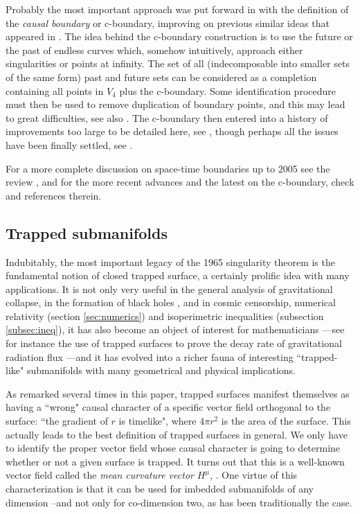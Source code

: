 \documentclass[12pt]{iopart}
\begin{document}
Probably the most important approach was put forward in \cite{GKP} with the definition of the {\em causal boundary} or c-boundary, improving on previous similar ideas that appeared in \cite{Se1}. The idea behind the c-boundary construction is to use the future or the past of endless curves which, somehow intuitively, approach either singularities or points at infinity. The set of all (indecomposable into smaller sets of the same form) past
and future sets can be considered as a completion containing all points in $V_4$ plus the
c-boundary. Some identification procedure must then be used to remove duplication of boundary points, and this may lead to great difficulties, see also \cite{HE}. The c-boundary then entered into a history of improvements too large to be detailed here, see \cite{MR,GS}, though perhaps all the issues have been finally settled, see \cite{FHS}.

 
For a more complete discussion on space-time boundaries up to 2005 see the review \cite{GS}, and for the more recent  advances and the latest on the c-boundary, check \cite{Flo,FH,FHS,FHS1} and references therein.


\subsection{Trapped submanifolds}\label{subsec:trapped2}
Indubitably, the most important legacy of the 1965 singularity theorem is the fundamental notion of closed trapped surface, a certainly prolific idea with many applications. It is not only very useful in the general analysis of gravitational collapse, in the formation of black holes \cite{GC1,BOM,GC2,GC3,GC4,GC5,Dafermos}, and in cosmic censorship, numerical relativity (section \ref{sec:numerics}) and isoperimetric inequalities (subsection \ref{subsec:ineq}), it has also  become an object of interest for mathematicians ---see for instance the use of trapped surfaces to prove the decay rate of gravitational radiation flux \cite{DaRo}---and it has evolved into a richer fauna of interesting ``trapped-like" submanifolds with many geometrical and physical implications. 

As remarked several times in this paper, trapped surfaces manifest themselves as having a ``wrong" causal character of a specific vector field orthogonal to the surface: ``the gradient of $r$ is timelike", where $4\pi r^2$ is the area of the surface. This actually leads to the best definition of trapped surfaces in general. We only have to identify the proper vector field whose causal character is going to determine whether or not a given surface is trapped. It turns out that this is a well-known vector field called the {\em mean curvature vector} $H^\mu$, \cite{Kri,MS,O,S2}. One virtue of this characterization is that it can be used for imbedded submanifolds of any dimension --and not only for co-dimension two, as has been traditionally the case.
\end{document}
